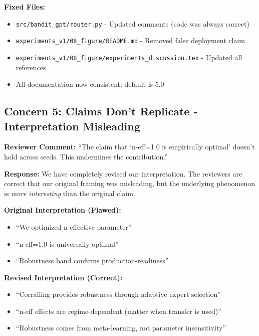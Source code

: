 \textbf{Fixed Files:}
\begin{itemize}[leftmargin=*, itemsep=2pt]
    \item \texttt{src/bandit\_gpt/router.py} - Updated comments (code was always correct)
    \item \texttt{experiments\_v1/08\_figure/README.md} - Removed false deployment claim
    \item \texttt{experiments\_v1/08\_figure/experiments\_discussion.tex} - Updated all references
    \item All documentation now consistent: default is 5.0
\end{itemize}


\subsection*{Concern 5: Claims Don't Replicate - Interpretation Misleading}

\textbf{Reviewer Comment:} ``The claim that `n-eff=1.0 is empirically optimal' doesn't hold across seeds. This undermines the contribution.''

\textbf{Response:} We have completely revised our interpretation. The reviewers are correct that our original framing was misleading, but the underlying phenomenon is \textit{more interesting} than the original claim.

\textbf{Original Interpretation (Flawed):}
\begin{itemize}[leftmargin=*, itemsep=2pt]
    \item ``We optimized n-effective parameter''
    \item ``n-eff=1.0 is universally optimal''
    \item ``Robustness band confirms production-readiness''
\end{itemize}

\textbf{Revised Interpretation (Correct):}
\begin{itemize}[leftmargin=*, itemsep=2pt]
    \item ``Corralling provides robustness through adaptive expert selection''
    \item ``n-eff effects are regime-dependent (matter when transfer is used)''
    \item ``Robustness comes from meta-learning, not parameter insensitivity''
\end{itemize}

